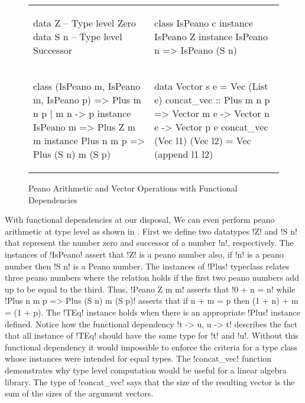 \documentclass[format=sigplan,manuscript,review,screen,nonacm,margin=1in]{acmart}
\begin{document}
\begin{figure}[ht]
  \begin{tabular}{l l}
\begin{code}
data Z   -- Type level Zero
data S n -- Type level Successor
\end{code}&%
\begin{code}
class IsPeano c
instance IsPeano Z
instance IsPeano n => IsPeano (S n)
\end{code}\\
\begin{code}
class (IsPeano m, IsPeano m, IsPeano p)
  => Plus m n p | m n -> p
instance IsPeano m => Plus Z m m
instance Plus n m p => Plus (S n) m (S p)
\end{code}&%
\begin{code}
data Vector s e = Vec (List e)
concat_vec :: Plus m n p
     => Vector m e -> Vector n e -> Vector p e
concat_vec (Vec l1) (Vec l2) = Vec (append l1 l2)
\end{code}
  \end{tabular}
  \caption{Peano Arithmetic and Vector Operations with Functional Dependencies}
  \label{fig:peano-arith}
\end{figure}
With functional dependencies at our disposal, We can even perform peano arithmetic at type level
as shown in . First we define two datatypes !Z! and !S n!
that represent the number zero and successor of a number !n!, respectively.
The instances of !IsPeano! assert that !Z! is a peano number also, if !n! is a peano number
then !S n! is a Peano number. The instances of !Plus! typeclass relates three peano numbers where the relation
holds if the first two peano numbers add up to be equal to the third. Thus, !Peano Z m m! asserts
that !0 + n = n! while !Plus n m p => Plus (S n) m (S p)! asserts that if n + m = p then (1 + n) + m = (1 + p).
The !TEq! instance holds when there is an appropriate !Plus! instance defined. Notice how the functional dependency
!t -> u, u -> t! describes the fact that all instance of !TEq! should have the same type for !t! and !u!. Without this
functional dependency it would impossible to enforce the criteria for a type class whose instances were intended for
equal types. The !concat_vec! function demonstrates why type level computation would be useful
for a linear algebra library. The type of !concat_vec! says that the size of the resulting
vector is the sum of the sizes of the argument vectors.
\end{document}
